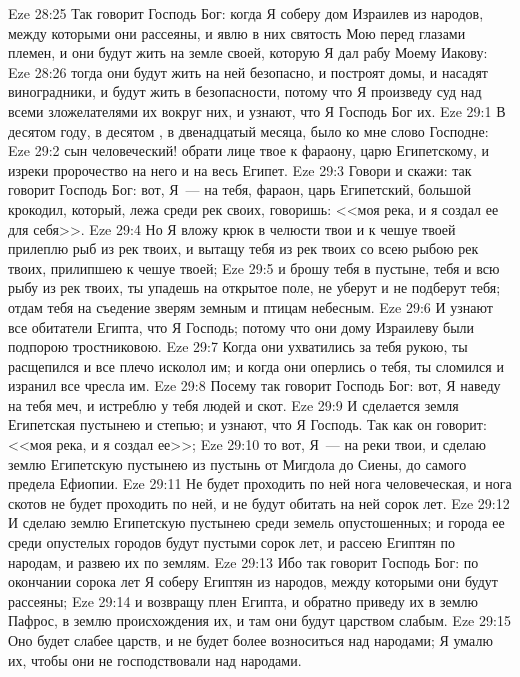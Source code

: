 \vs Eze 28:25 Так говорит Господь Бог: когда Я соберу дом Израилев из народов, между которыми они рассеяны, и явлю в них святость Мою перед глазами племен, и они будут жить на земле своей, которую Я дал рабу Моему Иакову:
\vs Eze 28:26 тогда они будут жить на ней безопасно, и построят домы, и насадят виноградники, и будут жить в безопасности, потому что Я произведу суд над всеми зложелателями их вокруг них, и узнают, что Я Господь Бог их.
\vs Eze 29:1 В десятом году, в десятом , в двенадцатый  месяца, было ко мне слово Господне:
\vs Eze 29:2 сын человеческий! обрати лице твое к фараону, царю Египетскому, и изреки пророчество на него и на весь Египет.
\vs Eze 29:3 Говори и скажи: так говорит Господь Бог: вот, Я~--- на тебя, фараон, царь Египетский, большой крокодил, который, лежа среди рек своих, говоришь: <<моя река, и я создал ее для себя>>.
\vs Eze 29:4 Но Я вложу крюк в челюсти твои и к чешуе твоей прилеплю рыб из рек твоих, и вытащу тебя из рек твоих со всею рыбою рек твоих, прилипшею к чешуе твоей;
\vs Eze 29:5 и брошу тебя в пустыне, тебя и всю рыбу из рек твоих, ты упадешь на открытое поле, не уберут и не подберут тебя; отдам тебя на съедение зверям земным и птицам небесным.
\vs Eze 29:6 И узнают все обитатели Египта, что Я Господь; потому что они дому Израилеву были подпорою тростниковою.
\vs Eze 29:7 Когда они ухватились за тебя рукою, ты расщепился и все плечо исколол им; и когда они оперлись о тебя, ты сломился и изранил все чресла им.
\vs Eze 29:8 Посему так говорит Господь Бог: вот, Я наведу на тебя меч, и истреблю у тебя людей и скот.
\vs Eze 29:9 И сделается земля Египетская пустынею и степью; и узнают, что Я Господь. Так как он говорит: <<моя река, и я создал ее>>;
\vs Eze 29:10 то вот, Я~--- на реки твои, и сделаю землю Египетскую пустынею из пустынь от Мигдола до Сиены, до самого предела Ефиопии.
\vs Eze 29:11 Не будет проходить по ней нога человеческая, и нога скотов не будет проходить по ней, и не будут обитать на ней сорок лет.
\vs Eze 29:12 И сделаю землю Египетскую пустынею среди земель опустошенных; и города ее среди опустелых городов будут пустыми сорок лет, и рассею Египтян по народам, и развею их по землям.
\vs Eze 29:13 Ибо так говорит Господь Бог: по окончании сорока лет Я соберу Египтян из народов, между которыми они будут рассеяны;
\vs Eze 29:14 и возвращу плен Египта, и обратно приведу их в землю Пафрос, в землю происхождения их, и там они будут царством слабым.
\vs Eze 29:15 Оно будет слабее  царств, и не будет более возноситься над народами; Я умалю их, чтобы они не господствовали над народами.
